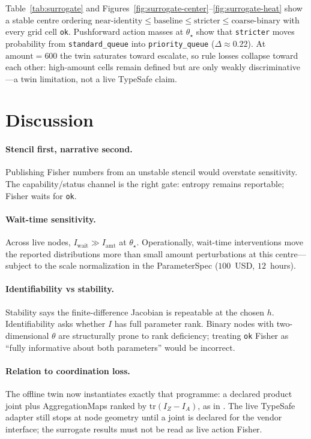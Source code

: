 \documentclass[11pt,a4paper]{article}
\begin{document}
Table~\ref{tab:surrogate} and Figures~\ref{fig:surrogate-center}--\ref{fig:surrogate-heat}
show a stable centre ordering
$\mathrm{near\text{-}identity}\le\mathrm{baseline}\le\mathrm{stricter}
\le\mathrm{coarse\text{-}binary}$
with every grid cell \texttt{ok}. Pushforward action masses at $\theta_\star$
show that \texttt{stricter} moves probability from \texttt{standard\_queue}
into \texttt{priority\_queue} ($\Delta\approx 0.22$). At
$\mathrm{amount}{=}600$ the twin saturates toward escalate, so rule losses
collapse toward each other: high-amount cells remain defined but are only weakly
discriminative---a twin limitation, not a live TypeSafe claim.

\section{Discussion}

\paragraph{Stencil first, narrative second.}
Publishing Fisher numbers from an unstable stencil would overstate
sensitivity. The capability/status channel is the right gate: entropy remains
reportable; Fisher waits for \texttt{ok}.

\paragraph{Wait-time sensitivity.}
Across live nodes, $I_{\mathrm{wait}}\gg I_{\mathrm{amt}}$ at $\theta_\star$.
Operationally, wait-time interventions move the reported distributions more
than small amount perturbations at this centre---subject to the scale
normalization in the ParameterSpec ($100$~USD, $12$~hours).

\paragraph{Identifiability vs stability.}
Stability says the finite-difference Jacobian is repeatable at the chosen $h$.
Identifiability asks whether $I$ has full parameter rank. Binary nodes with
two-dimensional $\theta$ are structurally prone to rank deficiency; treating
\texttt{ok} Fisher as ``fully informative about both parameters'' would be
incorrect.

\paragraph{Relation to coordination loss.}
The offline twin now instantiates exactly that programme: a declared product
joint plus AggregationMaps ranked by $\mathrm{tr}(I_Z-I_A)$, as in
\citet{li2026coordfisher}. The live TypeSafe adapter still stops at node
geometry until a joint is declared for the vendor interface; the surrogate
results must not be read as live action Fisher.
\end{document}
